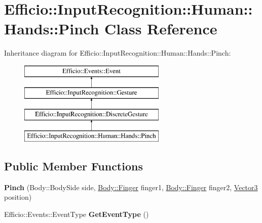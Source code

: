 \hypertarget{class_efficio_1_1_input_recognition_1_1_human_1_1_hands_1_1_pinch}{}\section{Efficio\+:\+:Input\+Recognition\+:\+:Human\+:\+:Hands\+:\+:Pinch Class Reference}
\label{class_efficio_1_1_input_recognition_1_1_human_1_1_hands_1_1_pinch}
Inheritance diagram for Efficio\+:\+:Input\+Recognition\+:\+:Human\+:\+:Hands\+:\+:Pinch\+:\begin{figure}[H]
\begin{center}
\leavevmode
\includegraphics[height=4.000000cm]{class_efficio_1_1_input_recognition_1_1_human_1_1_hands_1_1_pinch}
\end{center}
\end{figure}
\subsection*{Public Member Functions}
\begin{DoxyCompactItemize}
\item 
{\bfseries Pinch} (Body\+::\+Body\+Side side, \hyperlink{class_efficio_1_1_body_1_1_finger}{Body\+::\+Finger} finger1, \hyperlink{class_efficio_1_1_body_1_1_finger}{Body\+::\+Finger} finger2, \hyperlink{class_efficio_1_1_vector3}{Vector3} position)\hypertarget{class_efficio_1_1_input_recognition_1_1_human_1_1_hands_1_1_pinch_a8471ee0196227f2c491925955449f534}{}\label{class_efficio_1_1_input_recognition_1_1_human_1_1_hands_1_1_pinch_a8471ee0196227f2c491925955449f534}

\item 
Efficio\+::\+Events\+::\+Event\+Type {\bfseries Get\+Event\+Type} ()\hypertarget{class_efficio_1_1_input_recognition_1_1_human_1_1_hands_1_1_pinch_a579897e092310066f9dab8df222fc863}{}\label{class_efficio_1_1_input_recognition_1_1_human_1_1_hands_1_1_pinch_a579897e092310066f9dab8df222fc863}

\end{DoxyCompactItemize}
